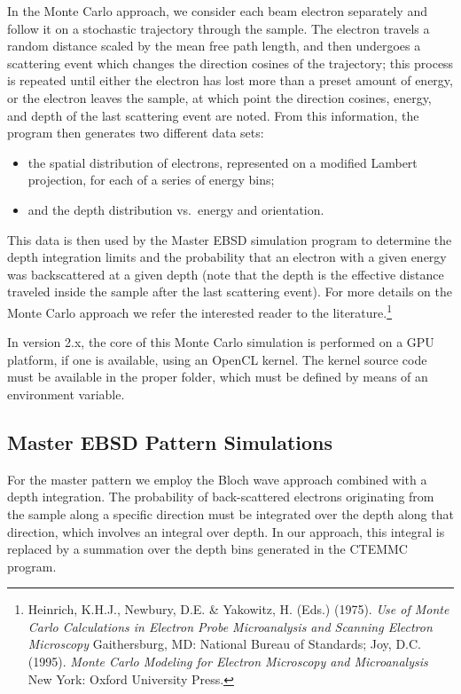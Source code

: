 \documentclass[DIV=calc, paper=letter, fontsize=11pt]{scrartcl}	 %
\begin{document}
In the Monte Carlo approach, we consider each beam electron separately and follow it on a stochastic trajectory 
through the sample.  The electron travels a random distance scaled by the mean free path length, and then undergoes a 
scattering event which changes the direction cosines of the trajectory; this process is repeated until either the electron has
lost more than a preset amount of energy, or the electron leaves the sample, at which point the direction cosines, energy,
and depth of the last scattering event are noted.  From this information, the program then generates two different data sets:
\begin{itemize}
	\item the spatial distribution of electrons, represented on a modified Lambert projection, for each of a series of 
	energy bins;
	\item and the depth distribution vs.\ energy and orientation.
\end{itemize}
This data is then used by the Master EBSD simulation program to determine the depth integration limits and the probability 
that an electron with a given energy was backscattered at a given depth (note that the depth is the effective distance traveled 
inside the sample after the last scattering event).  For more details on the Monte Carlo approach we refer the interested reader to
the literature.\footnote{Heinrich, K.H.J., Newbury, D.E. \& Yakowitz, H. (Eds.) (1975).
\textit{Use of Monte Carlo Calculations in Electron Probe Microanalysis and Scanning Electron Microscopy} Gaithersburg, MD: National Bureau of Standards;
Joy, D.C. (1995). \textit{Monte Carlo Modeling for Electron Microscopy and Microanalysis} New York: Oxford University Press.}

In version 2.x, the core of this Monte Carlo simulation is performed on a GPU platform, if one is available, using an OpenCL kernel.  The kernel source code 
must be available in the proper folder, which must be defined by means of an environment variable.

\subsection{Master EBSD Pattern Simulations \label{sec:Master}}
For the master pattern we employ the Bloch wave approach combined with a depth integration.  The probability 
of back-scattered electrons originating from the sample along a specific direction must be integrated over the depth
along that direction, which involves an integral over depth.  In our approach, this integral is replaced by a summation
over the depth bins generated in the \textsf{CTEMMC} program.  
\end{document}
